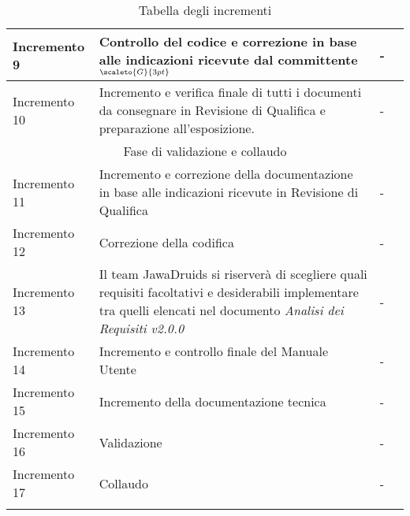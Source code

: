 \begin{center}
\begin{longtable}[c]{p{3cm}|p{5cm}|p{4cm}|p{3cm}}
		\hline
		\centering Incremento 9 & \centering Controllo del codice e correzione in base alle indicazioni ricevute dal committente$_{\scaleto{G}{3pt}}$ & \centering - & \makecell[tc]{-} \\
		\hline
		\centering Incremento 10 & \centering Incremento e verifica finale di tutti i documenti da consegnare in Revisione di Qualifica e preparazione all'esposizione. & \centering - & \makecell[tc]{-} \\
		\hline
		\multicolumn{4}{|c|}{Fase di validazione e collaudo}\\
		\hline
		\centering Incremento 11 & \centering Incremento e correzione della documentazione in base alle indicazioni ricevute in Revisione di Qualifica & \centering - & \makecell[tc]{-} \\
		\hline
		\centering Incremento 12 & \centering  Correzione della codifica  & \centering - & \makecell[tc]{-} \\
		\hline
		\centering Incremento 13 & \centering Il team JawaDruids si riserverà di scegliere quali requisiti facoltativi e desiderabili implementare tra quelli elencati nel documento \textit{Analisi dei Requisiti v2.0.0} & \centering - & \makecell[tc]{-} \\
		\hline
		\centering Incremento 14 & \centering Incremento e controllo finale del Manuale Utente & \centering - & \makecell[tc]{-} \\
		\hline
		\centering Incremento 15 & \centering Incremento della documentazione tecnica & \centering - & \makecell[tc]{-} \\
		\hline
		\centering Incremento 16 & \centering Validazione & \centering - & \makecell[tc]{-} \\
		\hline
		\centering Incremento 17 & \centering Collaudo & \centering - & \makecell[tc]{-} \\
		\hline
		\rowcolor{white}
		\caption[Nome caption]{Tabella degli incrementi}\label{qua va in base alle label di altre tabelle mi sa}
	\end{longtable}
\end{center}
